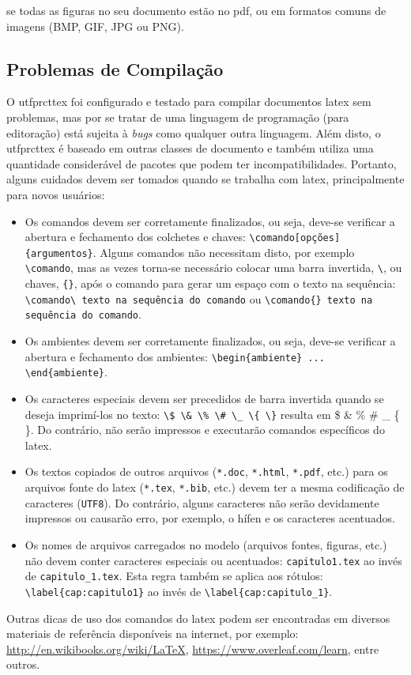 \noindent se todas as figuras no seu documento estão no \gls{pdf}, ou em formatos comuns de imagens (BMP, GIF, JPG ou PNG).

\subsection{Problemas de Compilação}\label{sec:problemas}

O \gls{utfprcttex} foi configurado e testado para compilar documentos \gls{latex} sem problemas, mas por se tratar de uma linguagem de programação (para editoração) está sujeita à \textit{bugs} como qualquer outra linguagem. Além disto, o \gls{utfprcttex} é baseado em outras classes de documento e também utiliza uma quantidade considerável de pacotes que podem ter incompatibilidades. Portanto, alguns cuidados devem ser tomados quando se trabalha com \gls{latex}, principalmente para novos usuários:

\begin{itemize}%
\item Os comandos devem ser corretamente finalizados, ou seja, deve-se verificar a abertura e fechamento dos colchetes e chaves: \verb|\comando[opções]{argumentos}|. Alguns comandos não necessitam disto, por exemplo \verb|\comando|, mas as vezes torna-se necessário colocar uma barra invertida, \verb|\|, ou chaves, \verb|{}|, após o comando para gerar um espaço com o texto na sequência: \verb|\comando\ texto na sequência do comando| ou \verb|\comando{} texto na sequência do comando|.
\item Os ambientes devem ser corretamente finalizados, ou seja, deve-se verificar a abertura e fechamento dos ambientes: \verb|\begin{ambiente} ... \end{ambiente}|.
\item Os caracteres especiais devem ser precedidos de barra invertida quando se deseja imprimí-los no texto: \verb|\$ \& \% \# \_ \{ \}| resulta em \$ \& \% \# \_ \{ \}. Do contrário, não serão impressos e executarão comandos específicos do \gls{latex}.
\item Os textos copiados de outros arquivos (\texttt{*.doc}, \texttt{*.html}, \texttt{*.pdf}, etc.) para os arquivos fonte do \gls{latex} (\texttt{*.tex}, \texttt{*.bib}, etc.) devem ter a mesma codificação de caracteres (\texttt{UTF8}). Do contrário, alguns caracteres não serão devidamente impressos ou causarão erro, por exemplo, o hífen e os caracteres acentuados.
\item Os nomes de arquivos carregados no modelo (arquivos fontes, figuras, etc.) não devem conter caracteres especiais ou acentuados: \verb|capitulo1.tex| ao invés de \verb|capitulo_1.tex|. Esta regra também se aplica aos rótulos: \verb|\label{cap:capitulo1}| ao invés de \verb|\label{cap:capitulo_1}|.
\end{itemize}

Outras dicas de uso dos comandos do \gls{latex} podem ser encontradas em diversos materiais de referência disponíveis na internet, por exemplo: \url{http://en.wikibooks.org/wiki/LaTeX}, \url{https://www.overleaf.com/learn}, entre outros.
